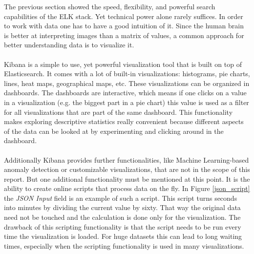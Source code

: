 \documentclass[bibliography=totoc]{article}
\begin{document}
The previous section showed the speed, flexibility, and powerful search capabilities
of the ELK stack. Yet technical power alone rarely suffices. In order to work with data 
one has to have a good intuition of it. Since the human brain is better at 
interpreting images than a matrix of values, a common approach for better understanding data 
is to visualize it.
\\
\\
Kibana is a simple to use, yet powerful visualization tool that is built on top 
of Elasticsearch. It comes with a lot of built-in visualizations: histograms, 
pie charts, lines, heat maps, geographical maps, etc. These visualizations can be organized
in dashboards. The dashboards are interactive, which means if one clicks on 
a value in a visualization (e.g. the biggest part in a pie chart) this value is used
as a filter for all visualizations that are part of the same dashboard.
This functionality makes exploring descriptive statistics really convenient 
because different aspects of the data can be looked at by experimenting and clicking
around in the dashboard.
\\
\\
Additionally Kibana provides further functionalities, like Machine Learning-based anomaly detection or customizable visualizations, that are not in the scope of this report. But one additional functionality must be mentioned at this point.
It is the 
ability to create online scripts that process data on the fly. In Figure \ref{json_script} 
the \textit{JSON Input} field is an example of such a script. This script turns seconds
into minutes by dividing the current value by sixty. That way the original data need not
be touched and the calculation is done only for the visualization. The drawback of this
scripting functionality is that the script needs to be run every time the visualization is loaded.
For huge datasets this can lead to long waiting times, especially when the scripting 
functionality is used in many visualizations.
\\
\\
\end{document}
